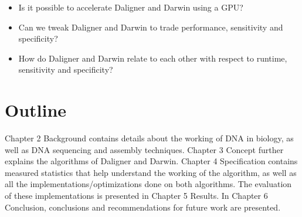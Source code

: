 \documentclass[../thesis.tex]{subfiles}
\begin{document}
\begin{itemize}
\item Is it possible to accelerate Daligner and Darwin using a GPU?
\item Can we tweak Daligner and Darwin to trade performance, sensitivity and specificity?
\item How do Daligner and Darwin relate to each other with respect to runtime, sensitivity and specificity?
\end{itemize}

\section{Outline}
Chapter 2 Background contains details about the working of DNA in biology, as well as DNA sequencing and assembly techniques.
Chapter 3 Concept further explains the algorithms of Daligner and Darwin.
Chapter 4 Specification contains measured statistics that help understand the working of the algorithm, as well as all the implementations/optimizations done on both algorithms.
The evaluation of these implementations is presented in Chapter 5 Results.
In Chapter 6 Conclusion, conclusions and recommendations for future work are presented.



\end{document}

